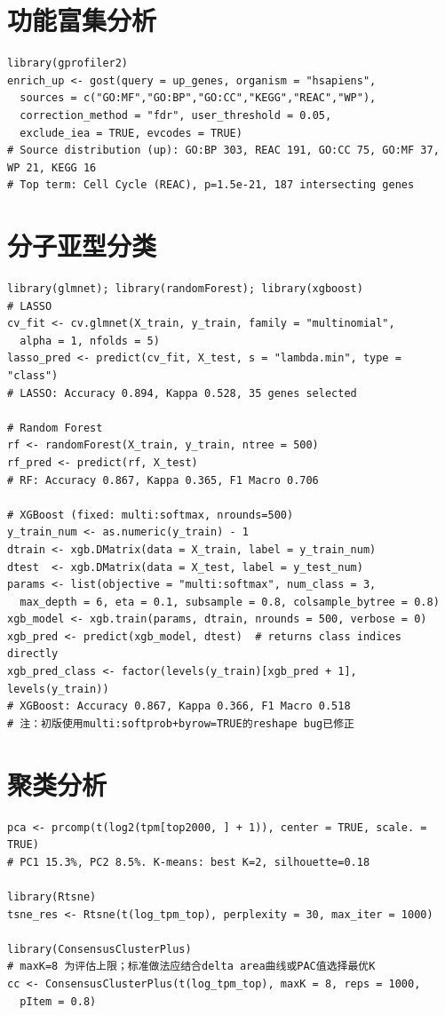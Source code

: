 \documentclass[12pt,a4paper,openany]{ctexbook}
\begin{document}
\section{功能富集分析}
\begin{lstlisting}[caption={g:Profiler功能富集}, basicstyle=\ttfamily\scriptsize]
library(gprofiler2)
enrich_up <- gost(query = up_genes, organism = "hsapiens",
  sources = c("GO:MF","GO:BP","GO:CC","KEGG","REAC","WP"),
  correction_method = "fdr", user_threshold = 0.05,
  exclude_iea = TRUE, evcodes = TRUE)
# Source distribution (up): GO:BP 303, REAC 191, GO:CC 75, GO:MF 37, WP 21, KEGG 16
# Top term: Cell Cycle (REAC), p=1.5e-21, 187 intersecting genes
\end{lstlisting}

\section{分子亚型分类}
\begin{lstlisting}[caption={LASSO/随机森林/XGBoost分类}, basicstyle=\ttfamily\scriptsize]
library(glmnet); library(randomForest); library(xgboost)
# LASSO
cv_fit <- cv.glmnet(X_train, y_train, family = "multinomial",
  alpha = 1, nfolds = 5)
lasso_pred <- predict(cv_fit, X_test, s = "lambda.min", type = "class")
# LASSO: Accuracy 0.894, Kappa 0.528, 35 genes selected

# Random Forest
rf <- randomForest(X_train, y_train, ntree = 500)
rf_pred <- predict(rf, X_test)
# RF: Accuracy 0.867, Kappa 0.365, F1 Macro 0.706

# XGBoost (fixed: multi:softmax, nrounds=500)
y_train_num <- as.numeric(y_train) - 1
dtrain <- xgb.DMatrix(data = X_train, label = y_train_num)
dtest  <- xgb.DMatrix(data = X_test, label = y_test_num)
params <- list(objective = "multi:softmax", num_class = 3,
  max_depth = 6, eta = 0.1, subsample = 0.8, colsample_bytree = 0.8)
xgb_model <- xgb.train(params, dtrain, nrounds = 500, verbose = 0)
xgb_pred <- predict(xgb_model, dtest)  # returns class indices directly
xgb_pred_class <- factor(levels(y_train)[xgb_pred + 1], levels(y_train))
# XGBoost: Accuracy 0.867, Kappa 0.366, F1 Macro 0.518
# 注：初版使用multi:softprob+byrow=TRUE的reshape bug已修正
\end{lstlisting}

\section{聚类分析}
\begin{lstlisting}[caption={PCA/t-SNE/K-means/共识聚类}, basicstyle=\ttfamily\scriptsize]
pca <- prcomp(t(log2(tpm[top2000, ] + 1)), center = TRUE, scale. = TRUE)
# PC1 15.3%, PC2 8.5%. K-means: best K=2, silhouette=0.18

library(Rtsne)
tsne_res <- Rtsne(t(log_tpm_top), perplexity = 30, max_iter = 1000)

library(ConsensusClusterPlus)
# maxK=8 为评估上限；标准做法应结合delta area曲线或PAC值选择最优K
cc <- ConsensusClusterPlus(t(log_tpm_top), maxK = 8, reps = 1000,
  pItem = 0.8)
\end{lstlisting}
\end{document}
